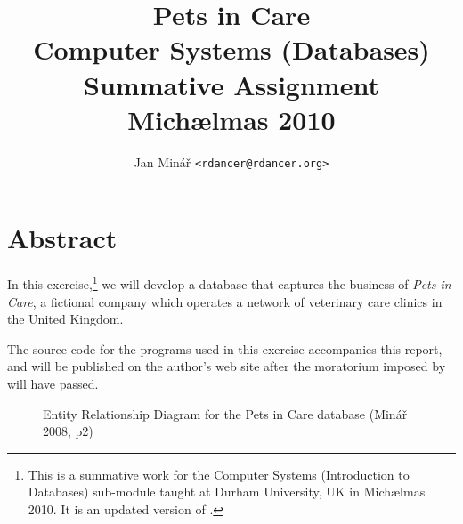 \documentclass[10pt]{report}
\author{Jan Minář {\tt <rdancer@rdancer.org>}}
\title{Pets in Care\\Computer Systems (Databases)\\Summative Assignment\\Michælmas 2010}
\begin{document}


\maketitle



\chapter{Abstract}
\thispagestyle{fancy}

In this exercise,\footnote{This is a summative work for the Computer Systems (Introduction to Databases) sub-module taught at Durham University, UK in Michælmas 2010.  It is an updated version of \cite{minarcsys}.} we will develop a database that captures the business of {\em Pets in Care}, a fictional company which operates a network of veterinary care clinics in the United Kingdom.

The source code for the programs used in this exercise accompanies this report, and will be published on the author's web site after the moratorium imposed by \cite{plagiarism} will have passed.

\begin{sidewaysfigure}
    \centering
    \caption{
	Entity Relationship Diagram for the Pets in Care database (Minář 2008, p2)
    }
    \label{flowchart}
\end{sidewaysfigure}
\end{document}
